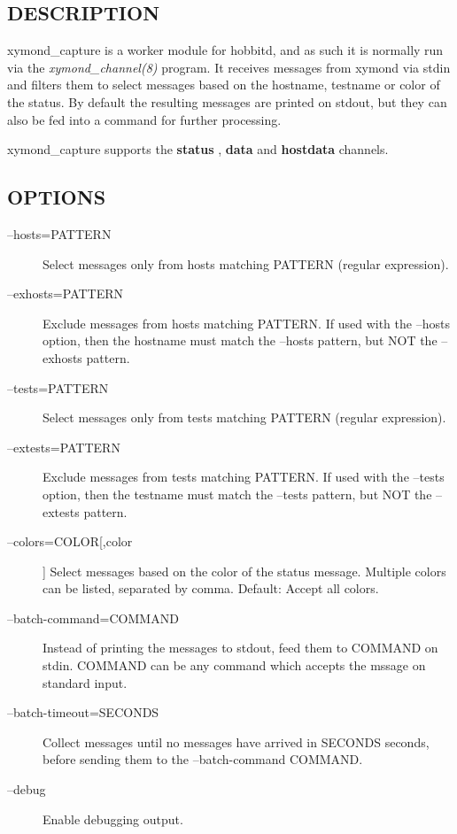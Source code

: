  
\subsection{DESCRIPTION}
 xymond\_capture is a worker module for hobbitd, and as such it is
 normally run via the \emph{xymond\_channel(8)} program. It receives
 messages from xymond via stdin and filters them to select messages
 based on the hostname, testname or color of the status. By default
 the resulting messages are printed on stdout, but they can also be
 fed into a command for further processing. 


  xymond\_capture supports the \textbf{status}
, \textbf{data}
 and \textbf{hostdata}
 channels. 


 
\subsection{OPTIONS}
\begin{description}
\item[--hosts=PATTERN] Select messages only from hosts matching
  PATTERN (regular expression). 


 

\item[--exhosts=PATTERN] Exclude messages from hosts matching
  PATTERN. If used with the --hosts option, then the hostname must
  match the --hosts pattern, but NOT the --exhosts pattern. 


 

\item[--tests=PATTERN] Select messages only from tests matching PATTERN (regular expression). 

 

\item[--extests=PATTERN] Exclude messages from tests matching
  PATTERN. If used with the --tests option, then the testname must
  match the --tests pattern, but NOT the --extests pattern. 


 

\item[--colors=COLOR[,color]] Select messages based on the color of
  the status message. Multiple colors can be listed, separated by
  comma. Default: Accept all colors. 


 

\item[--batch-command=COMMAND] Instead of printing the messages to
  stdout, feed them to COMMAND on stdin. COMMAND can be any command
  which accepts the mssage on standard input. 


 

\item[--batch-timeout=SECONDS] Collect messages until no messages have arrived in SECONDS seconds, before sending them to the --batch-command COMMAND. 

 

\item[--debug] Enable debugging output. 

 


\end{description}
